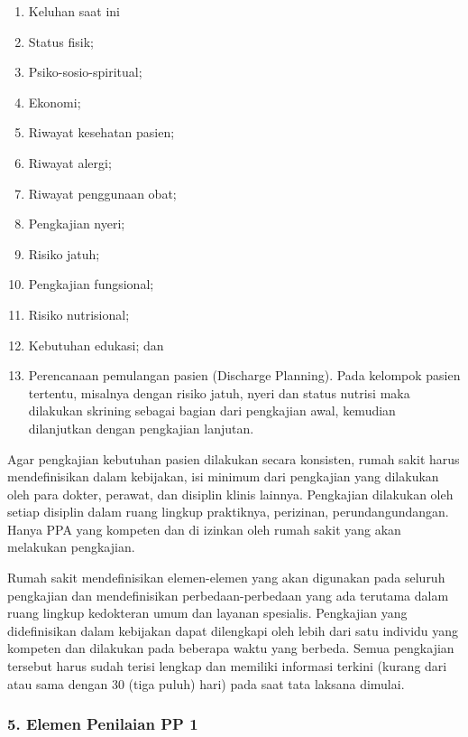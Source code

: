 \documentclass[
]{book}
\providecommand{\tightlist}{%
  \setlength{\itemsep}{0pt}\setlength{\parskip}{0pt}}
\begin{document}
\begin{enumerate}
\def\labelenumi{\alph{enumi}.}
\tightlist
\item
  Keluhan saat ini
\item
  Status fisik;
\item
  Psiko-sosio-spiritual;
\item
  Ekonomi;
\item
  Riwayat kesehatan pasien;
\item
  Riwayat alergi;
\item
  Riwayat penggunaan obat;
\item
  Pengkajian nyeri;
\item
  Risiko jatuh;
\item
  Pengkajian fungsional;
\item
  Risiko nutrisional;
\item
  Kebutuhan edukasi; dan
\item
  Perencanaan pemulangan pasien (Discharge Planning). Pada kelompok pasien tertentu, misalnya dengan risiko jatuh, nyeri dan status nutrisi maka dilakukan skrining sebagai bagian dari pengkajian awal, kemudian dilanjutkan dengan pengkajian lanjutan.
\end{enumerate}

Agar pengkajian kebutuhan pasien dilakukan secara konsisten, rumah sakit harus mendefinisikan dalam kebijakan, isi minimum dari pengkajian yang dilakukan oleh para dokter, perawat, dan disiplin klinis lainnya. Pengkajian dilakukan oleh setiap disiplin dalam ruang lingkup praktiknya, perizinan, perundangundangan. Hanya PPA yang kompeten dan di izinkan oleh rumah sakit yang akan melakukan pengkajian.

Rumah sakit mendefinisikan elemen-elemen yang akan digunakan pada seluruh pengkajian dan mendefinisikan perbedaan-perbedaan yang ada terutama dalam ruang lingkup kedokteran umum dan layanan spesialis. Pengkajian yang didefinisikan dalam kebijakan dapat dilengkapi oleh lebih dari satu individu yang kompeten dan dilakukan pada beberapa waktu yang berbeda. Semua pengkajian tersebut harus sudah terisi lengkap dan memiliki informasi terkini (kurang dari atau sama dengan 30 (tiga puluh) hari) pada saat tata laksana dimulai.

\hypertarget{elemen-penilaian-pp-1}{%
\subsubsection*{5. Elemen Penilaian PP 1}\label{elemen-penilaian-pp-1}}
\end{document}
